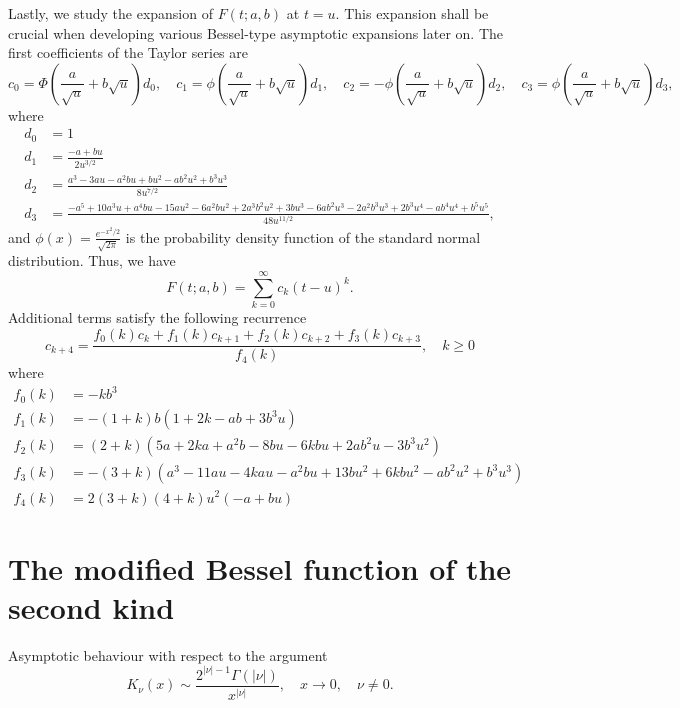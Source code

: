 \documentclass[10pt,a4paper,oneside]{article}
\numberwithin{equation}{section}
\begin{document}
Lastly, we study the expansion of $F(t;a,b)$ at $t=u$. This expansion shall be crucial when developing various Bessel-type asymptotic expansions later on. The first coefficients of the Taylor series are
\begin{equation*}
c_0 = \Phi\left(\frac{a}{\sqrt{u}} + b\sqrt{u}\right)d_0,\quad c_1 = \phi\left(\frac{a}{\sqrt{u}} + b\sqrt{u}\right) d_1, \quad c_2 = -\phi\left(\frac{a}{\sqrt{u}} + b\sqrt{u}\right) d_2, \quad
c_3 = \phi\left(\frac{a}{\sqrt{u}} + b\sqrt{u}\right) d_3,
\end{equation*}
where
\begin{align*}
d_0 &= 1\\
d_1 &= \frac{-a + bu}{2u^{3/2}}\\
d_2 &=\frac{a^3 -3au -a^2 bu + bu^2 -ab^2 u^2 + b^3u^3}{8 u^{7/2}}\\
d_3 &= \frac{-a^5 +10a^3u + a^4bu -15au^2 - 6a^2bu^2 + 2a^3 b^2 u^2 +3bu^3 -6ab^2u^3 - 2a^2b^3 u^3 + 2b^3 u^4 -ab^4u^4 + b^5 u^5}{48 u^{11/2}},
\end{align*}
and $\phi(x) = \frac{e^{-x^2/2}}{\sqrt{2\pi}}$ is the probability density function of the standard normal distribution. Thus, we have
\begin{equation}\label{phi_expansion_at_u}
F(t; a, b) = \sum_{k=0}^{\infty} c_k (t-u)^k.
\end{equation}
Additional terms satisfy the following recurrence
\begin{equation}
c_{k+4} = \frac{f_0(k) c_k + f_1(k) c_{k+1} + f_2(k) c_{k+2} + f_3(k) c_{k+3}}{f_4(k)}, \quad k \ge 0
\end{equation}
where
\begin{align*}
f_0(k) &= -kb^3\\
f_1(k) &= -(1 + k) b (1 + 2k -ab + 3b^3u)\\
f_2(k) &= (2 + k)(5a + 2ka +a^2b - 8bu - 6kbu +2ab^2u -3b^3u^2)\\
f_3(k) &= -(3 + k)(a^3 - 11au -4kau - a^2bu + 13bu^2 + 6kbu^2 -ab^2u^2 + b^3 u^3)\\
f_4(k) &= 2 (3 + k) (4 + k) u^2 (-a + bu)
\end{align*}

\section{The modified Bessel function of the second kind}
Asymptotic behaviour with respect to the argument
\begin{equation}\label{besselk_x_to_0}
K_{\nu}(x) \sim \frac{2^{|\nu| - 1} \Gamma(|\nu|)}{x^{|\nu|}}, \quad x \to 0, \quad \nu \neq 0.
\end{equation}
\end{document}
